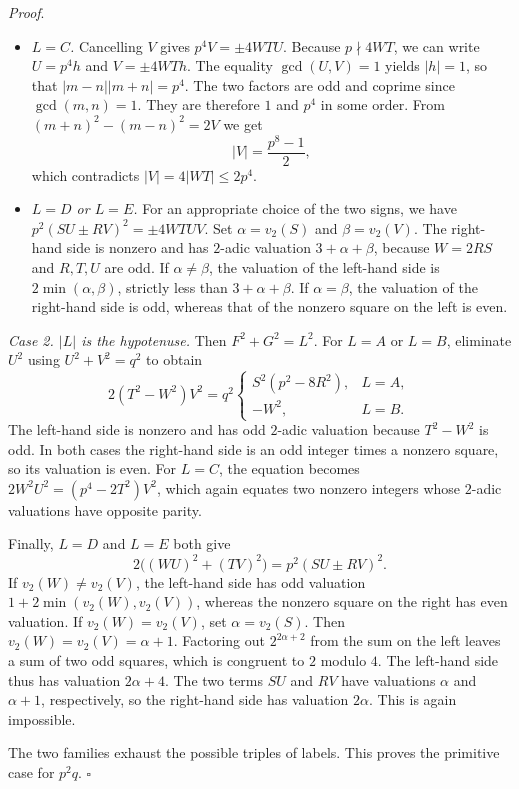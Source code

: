\documentclass[11pt,a4paper,twoside]{article}
\numberwithin{equation}{section}
\newcommand{\proseheadingstop}{.}
\providecommand{\proofname}{Proof}
\newenvironment{proof}[1][\proofname]{%
  \par\addvspace{.65\baselineskip}\noindent
  \textit{#1}\proseheadingstop\enspace\ignorespaces
}{%
  \unskip\nobreak\hfill\nobreak\(\square\)\par
  \addvspace{.65\baselineskip}
}
\begin{document}
\begin{proof}
\begin{itemize}
\item \textit{\(L=C\).} Cancelling \(V\) gives \(p^4V=\pm4WTU\).
Because \(p\nmid4WT\), we can write \(U=p^4h\) and \(V=\pm4WTh\).
The equality \(\gcd(U,V)=1\) yields \(|h|=1\), so that
\(\lvert m-n\rvert\lvert m+n\rvert=p^4\). The two factors are odd
and coprime since \(\gcd(m,n)=1\). They are therefore \(1\) and \(p^4\)
in some order. From \((m+n)^2-(m-n)^2=2V\) we get
\[
|V|=\frac{p^8-1}{2},
\]
which contradicts \(|V|=4|WT|\le2p^4\).

\item \textit{\(L=D\) or \(L=E\).} For an appropriate choice of the two
signs, we have \(p^2(SU\pm RV)^2=\pm4WTUV\). Set \(\alpha=v_2(S)\)
and \(\beta=v_2(V)\). The right-hand side is nonzero and has
\(2\)-adic valuation \(3+\alpha+\beta\), because \(W=2RS\) and
\(R,T,U\) are odd. If \(\alpha\ne\beta\), the valuation of the left-hand
side is \(2\min(\alpha,\beta)\), strictly less than \(3+\alpha+\beta\).
If \(\alpha=\beta\), the valuation of the right-hand side is odd,
whereas that of the nonzero square on the left is even.
\end{itemize}

\smallskip
\noindent\textit{Case 2. \(\lvert L\rvert\) is the hypotenuse.}
Then \(F^2+G^2=L^2\). For \(L=A\) or \(L=B\), eliminate \(U^2\) using
\(U^2+V^2=q^2\) to obtain
\[
2(T^2-W^2)V^2=q^2
\begin{cases}
S^2(p^2-8R^2), & L=A,\\
-W^2, & L=B.
\end{cases}
\]
The left-hand side is nonzero and has odd \(2\)-adic valuation because
\(T^2-W^2\) is odd. In both cases the right-hand side is an odd integer
times a nonzero square, so its valuation is even. For \(L=C\), the
equation becomes \(2W^2U^2=(p^4-2T^2)V^2\), which again equates two
nonzero integers whose \(2\)-adic valuations have opposite parity.

Finally, \(L=D\) and \(L=E\) both give
\[
2\bigl((WU)^2+(TV)^2\bigr)=p^2(SU\pm RV)^2.
\]
If \(v_2(W)\ne v_2(V)\), the left-hand side has odd valuation
\(1+2\min(v_2(W),v_2(V))\), whereas the nonzero square on the
right has even valuation. If \(v_2(W)=v_2(V)\), set \(\alpha=v_2(S)\).
Then \(v_2(W)=v_2(V)=\alpha+1\). Factoring out \(2^{2\alpha+2}\)
from the sum on the left leaves a sum of two odd squares, which is
congruent to \(2\) modulo \(4\). The left-hand side thus has valuation
\(2\alpha+4\). The two terms \(SU\) and \(RV\) have valuations
\(\alpha\) and \(\alpha+1\), respectively, so the right-hand side
has valuation \(2\alpha\). This is again impossible.

The two families exhaust the possible triples of labels. This proves
the primitive case for \(p^2q\).
\end{proof}
\end{document}
